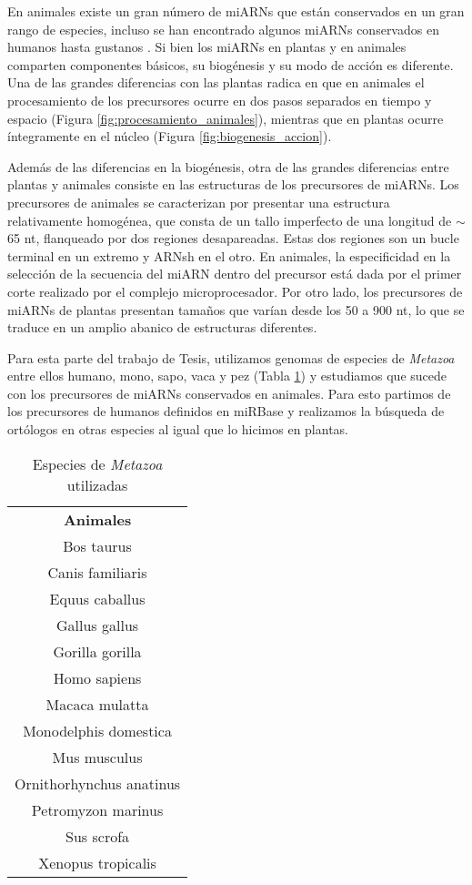 En animales existe un gran número de miARNs que están conservados en un gran rango de especies, incluso se han encontrado algunos miARNs conservados en humanos hasta gustanos \citep{pmid11081512}.
Si bien los miARNs en plantas y en animales comparten componentes básicos, su biogénesis y su modo de acción es diferente.
Una de las grandes diferencias con las plantas radica en que en animales el procesamiento de los precursores ocurre en dos pasos separados
en tiempo y espacio (Figura \ref{fig:procesamiento_animales}), mientras que en plantas ocurre íntegramente en el núcleo (Figura \ref{fig:biogenesis_accion}).

Además de las diferencias en la biogénesis, otra de las grandes diferencias entre plantas y animales consiste en las estructuras de los precursores de miARNs.
Los precursores de animales se caracterizan por presentar una estructura relativamente homogénea, que consta de un tallo imperfecto de una longitud de $\sim$65 nt, flanqueado por dos regiones desapareadas.
Estas dos regiones son un bucle terminal en un extremo y ARNsh en el otro.
En animales, la especificidad en la selección de la secuencia del miARN dentro del precursor está dada por el primer corte realizado por el complejo microprocesador.
Por otro lado, los precursores de miARNs de plantas presentan tamaños que varían desde los 50 a 900 nt, lo que se traduce en un amplio abanico de estructuras diferentes.

Para esta parte del trabajo de Tesis, utilizamos genomas de especies de \textit{Metazoa} entre ellos humano, mono, sapo, vaca y pez (Tabla \ref{table:db_metazoa}) y estudiamos que sucede con los precursores de miARNs conservados en animales.
Para esto partimos de los precursores de humanos definidos en miRBase y realizamos la búsqueda de ortólogos en otras especies al igual que lo hicimos en plantas.

\begin{table}[!htbp]
\centering
\small
\caption{Especies de \textit{Metazoa} utilizadas}
\label{table:db_metazoa}
\begin{tabular}{c}
\rowcolor[HTML]{ECF4FF} 
\textbf{Animales}        \\
	Bos taurus               \\
	Canis familiaris         \\
	Equus caballus           \\
	Gallus gallus            \\
	Gorilla gorilla          \\
	Homo sapiens             \\
	Macaca mulatta           \\
	Monodelphis domestica    \\
	Mus musculus             \\
	Ornithorhynchus anatinus \\
	Petromyzon marinus       \\
	Sus scrofa               \\
	Xenopus tropicalis      
\end{tabular}
\end{table}

